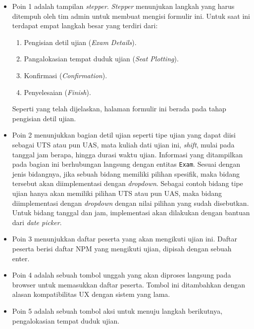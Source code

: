     \begin{itemize}
        \item Poin 1 adalah tampilan \textit{stepper}. \textit{Stepper}
            menunjukan langkah yang harus ditempuh oleh tim admin untuk membuat
            mengisi formulir ini. Untuk saat ini terdapat empat langkah besar
            yang terdiri dari:
                \begin{enumerate}
                    \item Pengisian detil ujian (\textit{Exam Details}).
                    \item Pangalokasian tempat duduk ujian (\textit{Seat Plotting}).
                    \item Konfirmasi (\textit{Confirmation}).
                    \item Penyelesaian (\textit{Finish}).
                \end{enumerate}
            Seperti yang telah dijelaskan, halaman formulir ini berada pada
            tahap pengisian detil ujian.
            
        \item Poin 2 menunjukkan bagian detil ujian seperti tipe ujian yang
            dapat diisi sebagai UTS atau pun UAS, mata kuliah dati ujian ini,
            \textit{shift}, mulai pada tanggal jam berapa, hingga durasi waktu ujian.
            Informasi yang ditampilkan pada bagian ini berhubungan langsung
            dengan entitas \texttt{Exam}. Sesuai dengan jenis bidangnya, jika
            sebuah bidang memiliki pilihan spesifik, maka bidang tersebut akan
            diimplementasi dengan \textit{dropdown}. Sebagai contoh bidang tipe
            ujian hanya akan memiliki pilihan UTS atau pun UAS, maka bidang
            diimplementasi dengan \textit{dropdown} dengan nilai pilihan yang
            sudah disebutkan. Untuk bidang tanggal dan jam, implementasi akan
            dilakukan dengan bantuan dari \textit{date picker}.
            
        \item Poin 3 menunjukkan daftar peserta yang akan mengikuti ujian ini.
            Daftar peserta berisi daftar NPM yang mengikuti ujian, dipisah
            dengan sebuah enter.
            
        \item Poin 4 adalah sebuah tombol unggah yang akan diproses langsung
            pada browser untuk memasukkan daftar peserta. Tombol ini ditambahkan
            dengan alasan kompatibilitas UX dengan sistem yang lama.
            
        \item Poin 5 adalah sebuah tombol aksi untuk menuju langkah berikutnya,
            pengalokasian tempat duduk ujian.
        
    \end{itemize}
    
